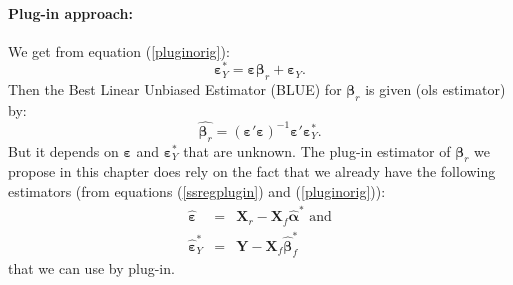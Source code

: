 \documentclass[12pt,a4paper]{report}
\begin{document}
\paragraph{Plug-in approach:}
We get from equation (\ref{pluginorig}):%
\begin{equation}
	\boldsymbol{\varepsilon}_Y^*%
	=\boldsymbol{\varepsilon}\boldsymbol{\beta}_r+\boldsymbol{\varepsilon}_Y. \label{eq:regplugin} 
\end{equation}
Then the Best Linear Unbiased Estimator ({\sc BLUE}) for $\boldsymbol{\beta}_r$ is given ({\sc ols} estimator) by:
\begin{equation}
  \hat{\boldsymbol{\beta}_r}=(\boldsymbol{\varepsilon}'\boldsymbol{\varepsilon})^{-1}\boldsymbol{\varepsilon}'\boldsymbol{\varepsilon}_Y^* . \label{olsplugin}
\end{equation}
    But it depends on $\boldsymbol{\varepsilon}$ and $\boldsymbol{\varepsilon}_Y^*$ that are unknown.
The plug-in estimator of $\boldsymbol{\beta}_r$ we propose in this chapter does rely on the fact that we already have the following estimators (from equations (\ref{ssregplugin}) and (\ref{pluginorig})):
	\begin{eqnarray}
		\hat{\boldsymbol{\varepsilon}}&=& \boldsymbol{X}_r-\boldsymbol{X}_f\hat{\boldsymbol{\alpha}}^* \nonumber \textrm{ and} \\
		\hat{\boldsymbol{\varepsilon}}_Y^*&=&\boldsymbol{Y}-\boldsymbol{X}_f\hat{\boldsymbol{\beta}}_f^* \nonumber
	\end{eqnarray}
	that we can use by plug-in.%
\end{document}
